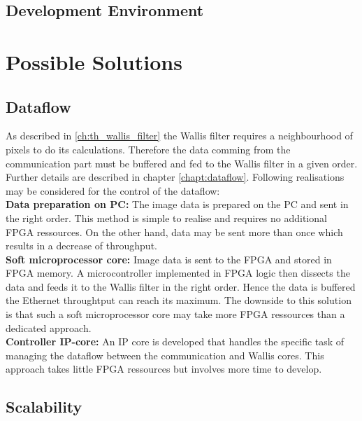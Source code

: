\subsection{Development Environment}

%
%
\section{Possible Solutions} \label{chapt:solutions}

\subsection{Dataflow} \label{chapt:mission:dataflow}
As described in \ref{ch:th_wallis_filter} the Wallis filter requires a
neighbourhood of pixels to do its calculations. Therefore the data comming from
the communication part must be buffered and fed to the Wallis filter in a given
order. Further details are described in chapter \ref{chapt:dataflow}. Following
realisations may be considered for the control of the dataflow:\\

\textbf{Data preparation on PC:} The image data is prepared on the PC and sent
in the right order. This method is simple to realise and requires no
additional FPGA ressources. On the other hand, data may be sent more than once
which results in a decrease of throughput.\\

\textbf{Soft microprocessor core:} Image data is sent to the FPGA and stored in
FPGA memory. A microcontroller implemented in FPGA logic then dissects the data
and feeds it to the Wallis filter in the right order. Hence the data is buffered
the Ethernet throughtput can reach its maximum. The downside to this solution
is that such a soft microprocessor core may take more FPGA ressources than a
dedicated approach.\\

\textbf{Controller IP-core:} An IP core is developed that handles the specific
task of managing the dataflow between the communication and Wallis cores. This
approach takes little FPGA ressources but involves more time to develop.

\subsection{Scalability} \label{chapt:mission:scalability}


